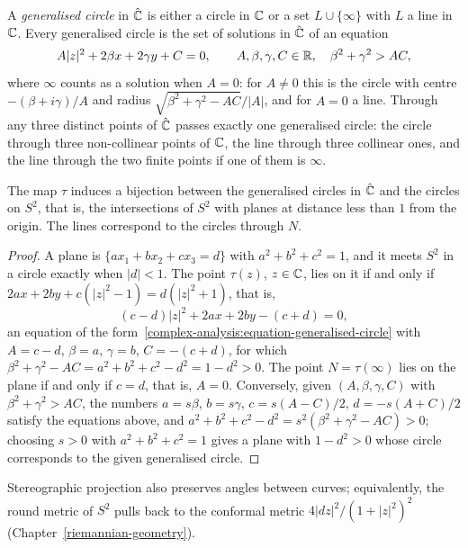 A \emph{generalised circle} in $\hat{\mathbb{C}}$ is either a circle in $\mathbb{C}$ or a set $L \cup \{\infty\}$ with $L$ a line in $\mathbb{C}$. Every generalised circle is the set of solutions in $\hat{\mathbb{C}}$ of an equation
\begin{equation}\label{complex-analysis:equation-generalised-circle}
A|z|^2 + 2\beta x + 2\gamma y + C = 0, \qquad A, \beta, \gamma, C \in \mathbb{R}, \quad \beta^2 + \gamma^2 > AC,
\end{equation}
where $\infty$ counts as a solution when $A = 0$: for $A \neq 0$ this is the circle with centre $-(\beta + i\gamma)/A$ and radius $\sqrt{\beta^2 + \gamma^2 - AC}/|A|$, and for $A = 0$ a line. Through any three
distinct points of $\hat{\mathbb{C}}$ passes exactly one generalised circle: the circle through three non-collinear points of $\mathbb{C}$, the line through three collinear ones, and the line through the two finite
points if one of them is $\infty$.

\begin{proposition}\label{complex-analysis:proposition-stereographic-circles}
The map $\tau$ induces a bijection between the generalised circles in $\hat{\mathbb{C}}$ and the circles on $S^2$, that is, the intersections of $S^2$ with planes at distance less than $1$ from the origin. The lines
correspond to the circles through $N$.
\end{proposition}

\begin{proof}
A plane is $\{a x_1 + bx_2 + cx_3 = d\}$ with $a^2 + b^2 + c^2 = 1$, and it meets $S^2$ in a circle exactly when $|d| < 1$. The point $\tau(z)$, $z \in \mathbb{C}$, lies on it if and only if
$2ax + 2by + c(|z|^2 - 1) = d(|z|^2 + 1)$, that is,
\[
(c - d)|z|^2 + 2ax + 2by - (c + d) = 0,
\]
an equation of the form~\eqref{complex-analysis:equation-generalised-circle} with $A = c - d$, $\beta = a$, $\gamma = b$, $C = -(c + d)$, for which $\beta^2 + \gamma^2 - AC = a^2 + b^2 + c^2 - d^2 = 1 - d^2 > 0$. The
point $N = \tau(\infty)$ lies on the plane if and only if $c = d$, that is, $A = 0$. Conversely, given $(A, \beta, \gamma, C)$ with $\beta^2 + \gamma^2 > AC$, the numbers $a = s\beta$, $b = s\gamma$, $c = s(A - C)/2$,
$d = -s(A + C)/2$ satisfy the equations above, and $a^2 + b^2 + c^2 - d^2 = s^2(\beta^2 + \gamma^2 - AC) > 0$; choosing $s > 0$ with $a^2 + b^2 + c^2 = 1$ gives a plane with $1 - d^2 > 0$ whose circle corresponds to the
given generalised circle.
\end{proof}

Stereographic projection also preserves angles between curves; equivalently, the round metric of $S^2$ pulls back to the conformal metric $4|dz|^2/(1 + |z|^2)^2$ (Chapter~\ref{riemannian-geometry}).

